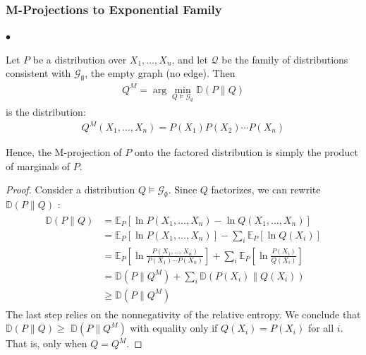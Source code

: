 \documentclass{article}
\begin{document}
\subsubsection{M-Projections to Exponential Family}
$\bullet$ 
\begin{lema}\label{lem:mdradf}
 Let $P$ be a distribution over $X_{1}, \ldots, X_{n}$, and let $\mathcal{Q}$ be the family of distributions consistent with $\mathcal{G}_{\emptyset}$, the empty graph (no edge). Then
\begin{align*}
Q^{M}=\arg \min _{Q \models \mathcal{G}_{\emptyset}} \mathbb{D}(P \| Q)
\end{align*}
is the distribution:
\begin{align*}
Q^{M}\left(X_{1}, \ldots, X_{n}\right)=P\left(X_{1}\right) P\left(X_{2}\right) \cdots P\left(X_{n}\right)
\end{align*}
\end{lema}
\begin{rema}
Hence, the M-projection of $P$ onto the factored distribution is simply the product of marginals of $P$.
\end{rema}
\begin{proof}
Consider a distribution $Q \models \mathcal{G}_{\emptyset}$. Since $Q$ factorizes, we can rewrite $\mathbb{D}(P \| Q)$ :
\begin{align*}
\begin{aligned}
\mathbb{D}(P \| Q) &=\mathbb{E}_{P}\left[\ln P\left(X_{1}, \ldots, X_{n}\right)-\ln Q\left(X_{1}, \ldots, X_{n}\right)\right] \\
&=\mathbb{E}_{P}\left[\ln P\left(X_{1}, \ldots, X_{n}\right)\right]-\sum_{i} \mathbb{E}_{P}\left[\ln Q\left(X_{i}\right)\right] \\
&=\mathbb{E}_{P}\left[\ln \frac{P\left(X_{1}, \ldots, X_{n}\right)}{P\left(X_{1}\right) \cdots P\left(X_{n}\right)}\right]+\sum_{i} \mathbb{E}_{P}\left[\ln \frac{P\left(X_{i}\right)}{Q\left(X_{i}\right)}\right] \\
&=\mathbb{D}\left(P \| Q^{M}\right)+\sum_{i} \mathbb{D}\left(P\left(X_{i}\right) \| Q\left(X_{i}\right)\right) \\
& \geq \mathbb{D}\left(P \| Q^{M}\right)
\end{aligned}
\end{align*}
The last step relies on the nonnegativity of the relative entropy. We conclude that $\mathbb{D}(P \| Q) \geq$ $\mathbb{D}\left(P \| Q^{M}\right)$ with equality only if $Q\left(X_{i}\right)=P\left(X_{i}\right)$ for all $i$. That is, only when $Q=Q^{M}$.
\end{proof}
\end{document}
